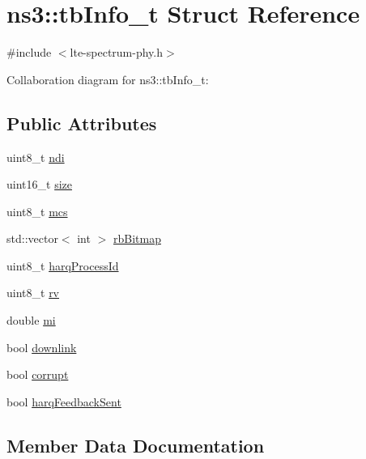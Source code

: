 \hypertarget{structns3_1_1tbInfo__t}{}\section{ns3\+:\+:tb\+Info\+\_\+t Struct Reference}
\label{structns3_1_1tbInfo__t}


{\ttfamily \#include $<$lte-\/spectrum-\/phy.\+h$>$}



Collaboration diagram for ns3\+:\+:tb\+Info\+\_\+t\+:
\subsection*{Public Attributes}
\begin{DoxyCompactItemize}
\item 
uint8\+\_\+t \hyperlink{structns3_1_1tbInfo__t_af2782f4af557c0c3b6b091c08e906a17}{ndi}
\item 
uint16\+\_\+t \hyperlink{structns3_1_1tbInfo__t_adc37f4eaa0fc3c51627cff0c4137d254}{size}
\item 
uint8\+\_\+t \hyperlink{structns3_1_1tbInfo__t_a59176372d70095b53aa5863f9fb5e841}{mcs}
\item 
std\+::vector$<$ int $>$ \hyperlink{structns3_1_1tbInfo__t_a80d554aa1ee4eb855236a0560a8b00f3}{rb\+Bitmap}
\item 
uint8\+\_\+t \hyperlink{structns3_1_1tbInfo__t_a2017d1a998a08b4e32823f71bf81f09a}{harq\+Process\+Id}
\item 
uint8\+\_\+t \hyperlink{structns3_1_1tbInfo__t_a86ba824881f63c3d230f7f5de7bc5cc6}{rv}
\item 
double \hyperlink{structns3_1_1tbInfo__t_ac60e6cd14190328b509222882714641d}{mi}
\item 
bool \hyperlink{structns3_1_1tbInfo__t_ad5acded7662b918654df2d5d567bf55d}{downlink}
\item 
bool \hyperlink{structns3_1_1tbInfo__t_a9746b8e2c258a911706706d1af5c1a96}{corrupt}
\item 
bool \hyperlink{structns3_1_1tbInfo__t_aad5c7a017ab94662d4dcaf33e11ba91c}{harq\+Feedback\+Sent}
\end{DoxyCompactItemize}


\subsection{Member Data Documentation}
